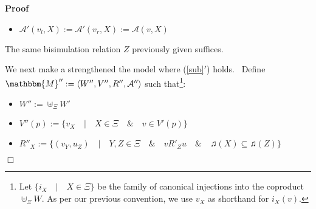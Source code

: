\documentclass{acmconf}
\newcommand{\assign}{:=}
\newenvironment{itemizedot}{\begin{itemize} \renewcommand{\labelitemi}{$\bullet$}\renewcommand{\labelitemii}{$\bullet$}\renewcommand{\labelitemiii}{$\bullet$}\renewcommand{\labelitemiv}{$\bullet$}}{\end{itemize}}
\newenvironment{proof}{\noindent\textbf{Proof\ }}{\hspace*{\fill}$\Box$\medskip}
\begin{document}
\begin{proof}
\begin{itemizedot}
    \item $\mathcal{A}' (v_l, X) \assign \mathcal{A}' (v_r, X) \assign
    \mathcal{A} (v, X)$
  \end{itemizedot}
  The same bisimulation relation $Z$ previously given suffices.
  
  
  
  We next make a strengthened the model where (\ref{sub}$'$) holds. \ Define
  $\mathbbm{M}'' \assign \langle W'', V'', R'', \mathcal{A}'' \rangle$ such
  that{\footnote{Let $\{i_X \hspace{1em} | \hspace{1em} X \in \Xi\}$ be the
  family of canonical injections into the coproduct $\uplus_{\Xi} W$. As per
  our previous convention, we use $v_X$ as shorthand for $i_X (v)$.}}:
  \begin{itemizedot}
    \item $W'' \assign \uplus_{\Xi} W'$
    
    \item $V'' (p) \assign \{v_X \hspace{1em} | \hspace{1em} X \in \Xi
    \hspace{1em} \& \hspace{1em} v \in V' (p)\}$
    
    \item $R''_X \assign \{(v_Y, u_Z) \hspace{1em} | \hspace{1em} Y, Z \in \Xi
    \hspace{1em} \& \hspace{1em} v R'_Z u \hspace{1em} \& \hspace{1em}
    \twonotes (X) \subseteq \twonotes (Z)\}$
    

\end{itemizedot}
\end{proof}
\end{document}
